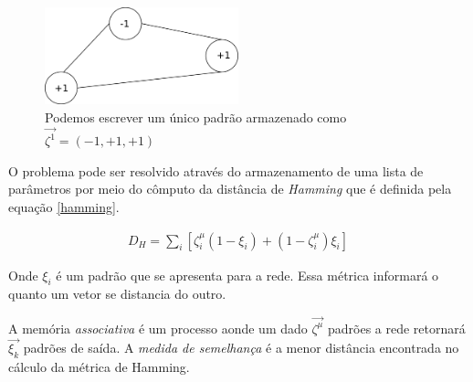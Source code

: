 \begin{figure}[H]
	\centering
	\includegraphics[width=0.5\textwidth]{Imagens/Fig19.png}
	\caption{Podemos escrever um único padrão armazenado como $\vec{\zeta^{1}}=(-1,+1,+1)$}
	\label{1padrao}
\end{figure}

O problema pode ser resolvido através do armazenamento de uma lista de parâmetros por meio do cômputo da distância de \textit{Hamming} que é definida pela equação \ref{hamming}.

\begin{eqnarray}
D_{H} = \sum_{i} [ \zeta^{\mu}_{i} (1-\xi_{i}) + (1 - \zeta^{\mu}_{i}) \xi_{i}]
\label{hamming}
\end{eqnarray}

Onde $\xi_{i}$ é um padrão que se apresenta para a rede. Essa métrica informará o quanto um vetor se distancia do outro.

A memória \textit{associativa} é um processo aonde um dado $\vec{\zeta^{\mu}}$ padrões a rede retornará $\vec{\xi_{k}}$ padrões de saída. A \textit{medida de semelhança} é a menor distância encontrada no cálculo da métrica de Hamming. 

\pagebreak
 
 

